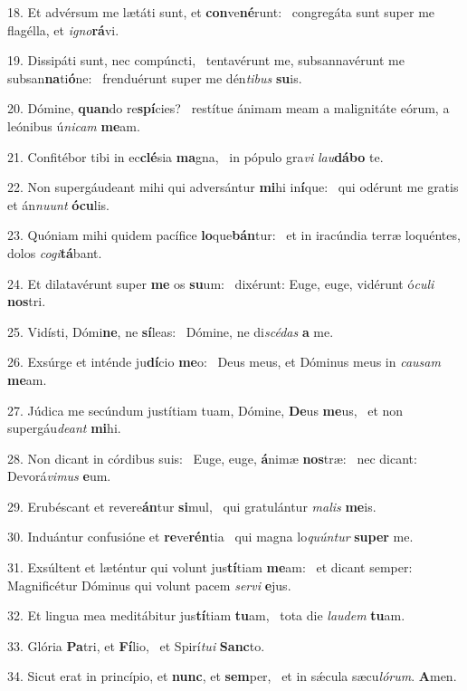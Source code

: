 18. Et advérsum me lætáti sunt, et \textbf{con}ve\textbf{né}runt: \ast\  congregáta sunt super me flagélla, et \textit{i}\textit{gno}\textbf{rá}vi.\

19. Dissipáti sunt, nec compúncti, \dag\  tentavérunt me, subsannavérunt me subsan\textbf{na}ti\textbf{ó}ne: \ast\  frenduérunt super me dén\textit{ti}\textit{bus} \textbf{su}is.\

20. Dómine, \textbf{quan}do re\textbf{spí}cies? \ast\  restítue ánimam meam a malignitáte eórum, a leónibus ú\textit{ni}\textit{cam} \textbf{me}am.\

21. Confitébor tibi in ec\textbf{clé}sia \textbf{ma}gna, \ast\  in pópulo gra\textit{vi} \textit{lau}\textbf{dá}\textbf{bo} te.\

22. Non supergáudeant mihi qui adversántur \textbf{mi}hi in\textbf{í}que: \ast\  qui odérunt me gratis et án\textit{nu}\textit{unt} \textbf{ó}\textbf{cu}lis.\

23. Quóniam mihi quidem pacífice \textbf{lo}que\textbf{bán}tur: \ast\  et in iracúndia terræ loquéntes, dolos \textit{co}\textit{gi}\textbf{tá}bant.\

24. Et dilatavérunt super \textbf{me} os \textbf{su}um: \ast\  dixérunt: Euge, euge, vidérunt ó\textit{cu}\textit{li} \textbf{nos}tri.\

25. Vidísti, Dómi\textbf{ne}, ne \textbf{sí}leas: \ast\  Dómine, ne di\textit{scé}\textit{das} \textbf{a} me.\

26. Exsúrge et inténde ju\textbf{dí}cio \textbf{me}o: \ast\  Deus meus, et Dóminus meus in \textit{cau}\textit{sam} \textbf{me}am.\

27. Júdica me secúndum justítiam tuam, Dómine, \textbf{De}us \textbf{me}us, \ast\  et non supergáu\textit{de}\textit{ant} \textbf{mi}hi.\

28. Non dicant in córdibus suis: \dag\  Euge, euge, \textbf{á}nimæ \textbf{nos}træ: \ast\  nec dicant: Devorá\textit{vi}\textit{mus} \textbf{e}um.\

29. Erubéscant et revere\textbf{án}tur \textbf{si}mul, \ast\  qui gratulántur \textit{ma}\textit{lis} \textbf{me}is.\

30. Induántur confusióne et \textbf{re}ve\textbf{rén}tia \ast\  qui magna lo\textit{quún}\textit{tur} \textbf{su}\textbf{per} me.\

31. Exsúltent et læténtur qui volunt jus\textbf{tí}tiam \textbf{me}am: \ast\  et dicant semper: Magnificétur Dóminus qui volunt pacem \textit{ser}\textit{vi} \textbf{e}jus.\

32. Et lingua mea meditábitur jus\textbf{tí}tiam \textbf{tu}am, \ast\  tota die \textit{lau}\textit{dem} \textbf{tu}am.\

33. Glória \textbf{Pa}tri, et \textbf{Fí}lio, \ast\  et Spirí\textit{tu}\textit{i} \textbf{Sanc}to.\

34. Sicut erat in princípio, et \textbf{nunc}, et \textbf{sem}per, \ast\  et in sǽcula sæcu\textit{ló}\textit{rum}. \textbf{A}men.\

